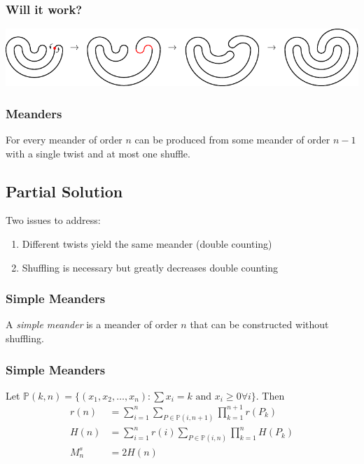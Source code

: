 \documentclass{beamer}
\begin{document}
\begin{frame}
\frametitle{Will it work?}
\begin{center}
\includegraphics[width=\textwidth]{meanders/5-shuffle.pdf}
\end{center}

\end{frame}

\begin{frame}
\frametitle{Meanders}
\begin{theorem}
For every meander of order $n$ can be produced from some meander of order $n-1$ with a single twist and at most one shuffle.
\end{theorem}
\end{frame}

\subsection{Partial Solution}
\begin{frame}
Two issues to address:
\begin{enumerate}
\item Different twists yield the same meander (double counting)
\item Shuffling is necessary but greatly decreases double counting
\end{enumerate}
\end{frame}

\begin{frame}
\frametitle{Simple Meanders}
\begin{definition}
A \emph{simple meander} is a meander of order $n$ that can be constructed without shuffling.
\end{definition}
\end{frame}

\begin{frame}
\frametitle{Simple Meanders}
\renewcommand{\P}{\mathbb{P}}

\begin{theorem}
Let $\P(k,n) = \{(x_1,x_2,\ldots,x_n) : \sum x_i = k \text{ and } x_i\ge 0 \forall i\}$. Then
\begin{align*}
r(n) &= \sum_{i=1}^n\sum_{P\in\P(i,n+1)}\prod^{n+1}_{k = 1} r(P_k)\\
H(n) &= \sum_{i=1}^n r(i) \sum_{P\in\P(i,n)}\prod^{n}_{k = 1} H(P_k)\\
M^s_n &= 2H(n)
\end{align*}
\end{theorem}
\end{frame}
\end{document}
